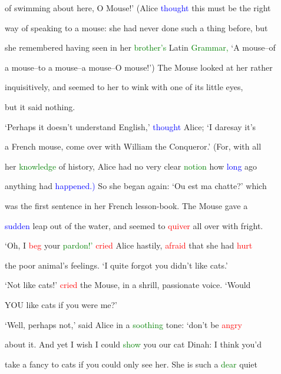  of \textcolor{BurntOrange}{swimming} about here, O Mouse!’ (Alice \textcolor{blue}{thought} this must be the right

 way of speaking to a mouse: she had never done such a thing before, but

 she remembered having seen in her \textcolor{green}{brother’s} Latin \textcolor{green}{Grammar,} ‘A mouse--of

 a mouse--to a mouse--a mouse--O mouse!’) The Mouse looked at her rather

 inquisitively, and seemed to her to wink with one of its little eyes,

 but it said nothing.



 ‘Perhaps it doesn’t understand English,’ \textcolor{blue}{thought} Alice; ‘I daresay it’s

 a French mouse, come over with William the Conqueror.’ (For, with all

 her \textcolor{green}{knowledge} of history, Alice had no very clear \textcolor{green}{notion} how \textcolor{blue}{long} ago

 anything had \textcolor{blue}{happened.)} So she began again: ‘Ou est ma chatte?’ which

 was the first \textcolor{BurntOrange}{sentence} in her French lesson-book. The Mouse gave a

 \textcolor{blue}{sudden} leap out of the water, and seemed to \textcolor{red}{quiver} all over with \textcolor{BurntOrange}{fright.}

 ‘Oh, I \textcolor{red}{beg} your \textcolor{green}{pardon!’} \textcolor{red}{cried} Alice hastily, \textcolor{red}{afraid} that she had \textcolor{red}{hurt}

 the poor animal’s \textcolor{BurntOrange}{feelings.} ‘I quite forgot you didn’t like cats.’



 ‘Not like cats!’ \textcolor{red}{cried} the Mouse, in a \textcolor{BurntOrange}{shrill,} \textcolor{BurntOrange}{passionate} voice. ‘Would

 YOU like cats if you were me?’



 ‘Well, perhaps not,’ said Alice in a \textcolor{green}{soothing} tone: ‘don’t be \textcolor{red}{angry}

 about it. And yet I wish I could \textcolor{green}{show} you our cat Dinah: I think you’d

 take a \textcolor{BurntOrange}{fancy} to cats if you could only see her. She is such a \textcolor{green}{dear} \textcolor{BurntOrange}{quiet}

